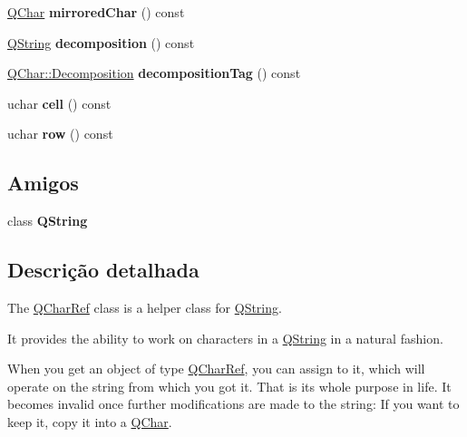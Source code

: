 \begin{DoxyCompactItemize}
\item 
\hypertarget{class_q_char_ref_ab4c441625b82dd484d352d4150404967}{\hyperlink{class_q_char}{Q\-Char} {\bfseries mirrored\-Char} () const }\label{class_q_char_ref_ab4c441625b82dd484d352d4150404967}

\item 
\hypertarget{class_q_char_ref_acba9fa01bc9c2d6aad7ef6e16e5aaa1d}{\hyperlink{class_q_string}{Q\-String} {\bfseries decomposition} () const }\label{class_q_char_ref_acba9fa01bc9c2d6aad7ef6e16e5aaa1d}

\item 
\hypertarget{class_q_char_ref_a701e7f71528ce064374ada9a645211df}{\hyperlink{class_q_char_a9416cff6b11eb874218733dac5b6ea96}{Q\-Char\-::\-Decomposition} {\bfseries decomposition\-Tag} () const }\label{class_q_char_ref_a701e7f71528ce064374ada9a645211df}

\item 
\hypertarget{class_q_char_ref_aedc1937b3c25b2152389eddaf86fa95a}{uchar {\bfseries cell} () const }\label{class_q_char_ref_aedc1937b3c25b2152389eddaf86fa95a}

\item 
\hypertarget{class_q_char_ref_aa1a82555b4e32743a9d5303ebf7a95a4}{uchar {\bfseries row} () const }\label{class_q_char_ref_aa1a82555b4e32743a9d5303ebf7a95a4}

\end{DoxyCompactItemize}
\subsection*{Amigos}
\begin{DoxyCompactItemize}
\item 
\hypertarget{class_q_char_ref_a9e1fc451dd8095b29e730972a34bad70}{class {\bfseries Q\-String}}\label{class_q_char_ref_a9e1fc451dd8095b29e730972a34bad70}

\end{DoxyCompactItemize}


\subsection{Descrição detalhada}
The \hyperlink{class_q_char_ref}{Q\-Char\-Ref} class is a helper class for \hyperlink{class_q_string}{Q\-String}. 

It provides the ability to work on characters in a \hyperlink{class_q_string}{Q\-String} in a natural fashion.

When you get an object of type \hyperlink{class_q_char_ref}{Q\-Char\-Ref}, you can assign to it, which will operate on the string from which you got it. That is its whole purpose in life. It becomes invalid once further modifications are made to the string\-: If you want to keep it, copy it into a \hyperlink{class_q_char}{Q\-Char}.

